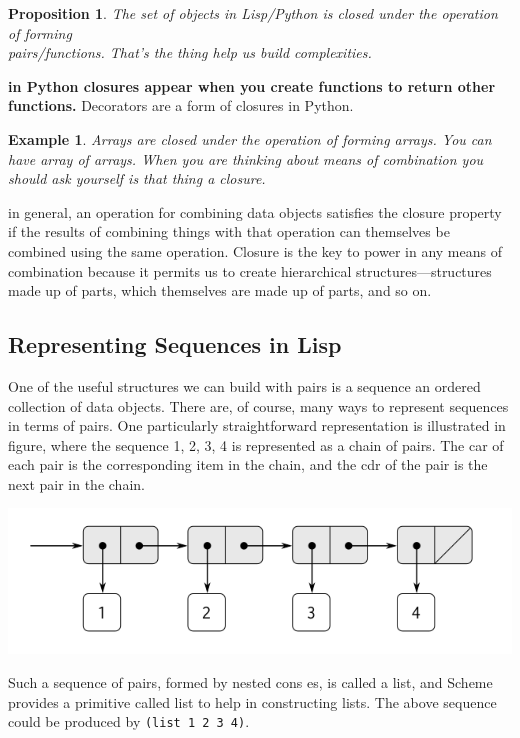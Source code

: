 \documentclass[a4paper,twoside]{article}
\newtheorem{proposition}[theorem]{Proposition}
\newtheorem{example}[theorem]{Example}
\numberwithin{equation}{section}
\begin{document}
\begin{proposition}
    The set of objects in Lisp/Python is closed under the operation of forming \\
    pairs/functions. That's the thing help us build complexities.
\end{proposition}
\textbf{in Python closures appear when you create functions to return other functions.} Decorators
are a form of closures in Python.
\begin{example}
    Arrays are closed under the operation of forming arrays. You can have array of arrays. When you
    are thinking about means of combination you should ask yourself is that thing a closure.
\end{example}
in general, an operation for combining data objects satisfies the closure property if the results of
combining things with that operation can themselves be combined using the same operation.\newline
Closure is the key to power in any means of combination because it permits us to create hierarchical
structures—structures made up of parts, which themselves are made up of parts, and so on.
\subsection{Representing Sequences in Lisp}
One of the useful structures we can build with pairs is a sequence an ordered collection of data objects.
There are, of course, many ways to represent sequences in terms of pairs. One particularly
straightforward representation is illustrated in figure, where the sequence 1, 2, 3, 4 is
represented as a chain of pairs. The car of each pair is the corresponding item in the chain,
and the cdr of the pair is the next pair in the chain.
\begin{center}
    \includegraphics[scale = 0.25]{assets/lisp_list.png}
\end{center}
Such a sequence of pairs, formed by nested cons es, is called a list, and Scheme provides a primitive
called list to help in constructing lists. The above sequence could be produced by \texttt{(list 1 2 3 4)}.
\end{document}
